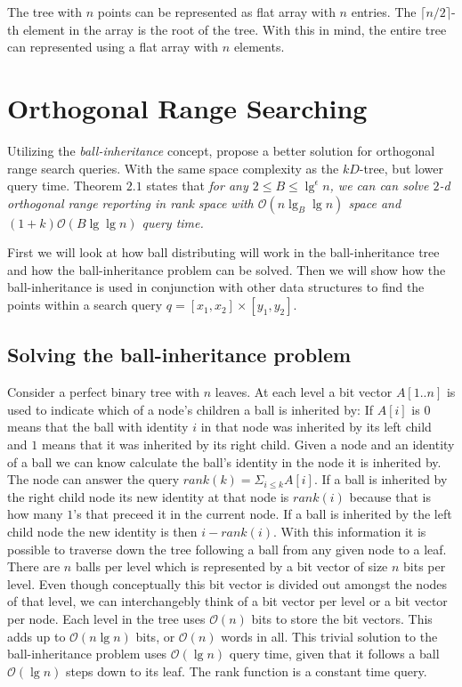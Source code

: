 The tree with $n$ points can be represented as flat array with $n$ entries. The $\lceil n/2 \rceil$-th element in the array is the root of the tree.
 With this in mind, the entire tree can represented using a flat array with $n$ elements. 




\section{Orthogonal Range Searching}
\label{sect:original}
Utilizing the \emph{ball-inheritance} concept, \citeauthor{chanetal} propose a better solution for orthogonal range search queries. With the same space complexity as the $kD$-tree, but lower query time. Theorem $2.1$ states that \emph{for any $2 \leq B \leq \lg^\epsilon n$, we can can solve $2$-d orthogonal range reporting in rank space with $\mathcal{O}(n \lg_B \lg n)$ space and $(1+k)\mathcal{O}(B \lg \lg n)$ query time.}

First we will look at how ball distributing will work in the ball-inheritance tree and how the ball-inheritance problem can be solved. Then we will show how the ball-inheritance is used in conjunction with other data structures to find the points within a search query $q = [x_1, x_2] \times [y_1, y_2]$.

\subsection{Solving the ball-inheritance problem} 
\label{ssection:solving-ball}

Consider a perfect binary tree with $n$ leaves. At each level a bit vector $A[1..n]$ is used to indicate which of a node's children a ball is inherited by: If $A[i]$ is $0$ means that the ball with identity $i$ in that node was inherited by its left child and $1$ means that it was inherited by its right child. Given a node and an identity of a ball we can know calculate the ball's identity in the node it is inherited by. The node can answer the query $rank(k) = \Sigma_{i \leq k} A[i]$. If a ball is inherited by the right child node its new identity at that node is $rank(i)$ because that is how many $1$'s that preceed it in the current node. If a ball is inherited by the left child node the new identity is then $i-rank(i)$. With this information it is possible to traverse down the tree following a ball from any given node to a leaf. There are $n$ balls per level which is represented by a bit vector of size $n$ bits per level. Even though conceptually this bit vector is divided out amongst the nodes of that level, we can interchangebly think of a bit vector per level or a bit vector per node. Each level in the tree uses $\mathcal{O}(n)$ bits to store the bit vectors. This adds up to $\mathcal{O}(n \lg n)$ bits, or $\mathcal{O}(n)$ words in all. This trivial solution to the ball-inheritance problem uses $\mathcal{O}(\lg n)$ query time, given that it follows a ball $\mathcal{O}(\lg n)$ steps down to its leaf. The rank function is a constant time query. \\


